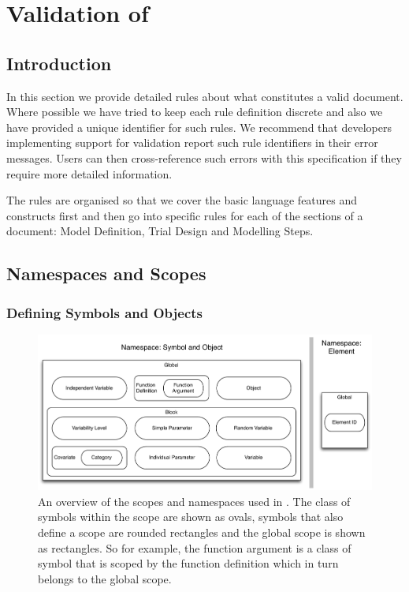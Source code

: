 \chapter{Validation of \pharmml}
\label{chapter:validation}

\newenvironment{valrules}{\begin{description}}{\end{description}}
\newcommand*{\valrule}[2]{\item[#1] \emph{#2}}

\renewcommand{\arraystretch}{1.25}


\section{Introduction}

In this section we provide detailed rules about what constitutes a
valid \pharmml document. Where possible we have tried to keep each
rule definition discrete and also we have provided a unique
identifier for such rules. We recommend that developers implementing
support for \pharmml validation report such rule identifiers in their
error messages. Users can then cross-reference such errors with this
specification if they require more detailed information.

The rules are organised so that we cover the basic language features
and constructs first and then go into specific rules for each of the
sections of a \pharmml document: Model Definition, Trial Design and
Modelling Steps.

\section{Namespaces and Scopes}
\label{sec:symbolScoping}

\subsection{Defining Symbols and Objects}

\begin{figure}
\includegraphics[width=\linewidth]{figures/scope_namespaces_overview}
\caption{An overview of the scopes and namespaces used in
  \pharmml. The class of symbols within the scope are shown as
  ovals, symbols that also define a scope are rounded rectangles
  and the global scope is shown as rectangles. So for example, the
  function argument is a class of symbol that is scoped by the
  function definition which in turn belongs to the global scope.}
\label{fig:scopes-overview}
\end{figure}

